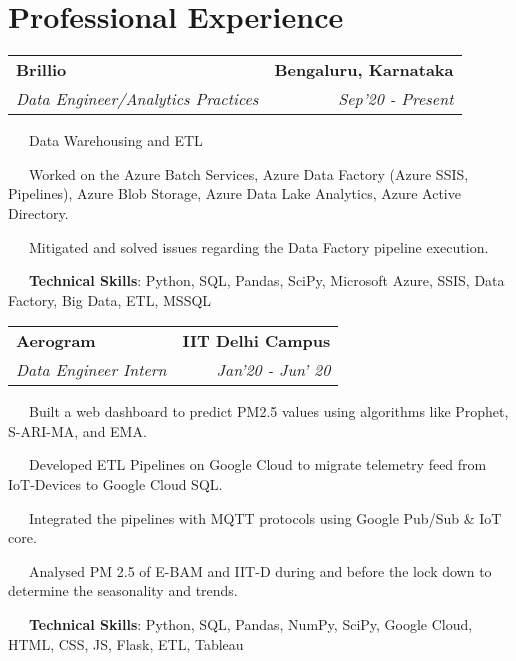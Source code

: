 \documentclass[a4paper,20pt]{article}
\makeatletter
\newcommand{\resumeSubheading}[4]{
  \vspace{-1pt}\item
    \begin{tabular*}{0.97\textwidth}{l@{\extracolsep{\fill}}r}
      \textbf{#1} & #2 \\
      \textit{#3} & \textit{#4} \\
    \end{tabular*}\vspace{-5pt}
}
\makeatother
\begin{document}
\section{Professional Experience}
  \resumeSubheading
      {\textbf{Brillio}}{\textbf{Bengaluru, Karnataka}}
      {Data Engineer/Analytics Practices}{Sep'20 - Present}
    \resumeSubHeadingEnd
     \begin{description}[font=$\bullet$]
        \item {~~~}{Data Warehousing and ETL}
        \vspace{-5pt}
        \item {~~~}{Worked on the Azure Batch Services, Azure Data Factory (Azure SSIS, Pipelines), Azure Blob Storage, Azure Data Lake Analytics, Azure Active Directory.}
        \vspace{-5pt}
        \item {~~~}{Mitigated and solved issues regarding the Data Factory pipeline execution.}
        \vspace{-5pt}
        \item {~~~}{\textbf{Technical Skills}: Python, SQL, Pandas, SciPy, Microsoft Azure, SSIS, Data Factory, Big Data, ETL, MSSQL}
    \end{description}
\vspace{-5pt}
  \resumeSubheading
      {\textbf{Aerogram }}{\textbf{IIT Delhi Campus}}
      {Data Engineer Intern}{Jan'20 - Jun' 20}
    \resumeSubHeadingEnd
     \begin{description}[font=$\bullet$]
        \item {~~~}{Built a web dashboard to predict PM2.5 values using algorithms like Prophet, S-ARI-MA, and EMA.}
        \vspace{-5pt}
        \item {~~~}{Developed ETL Pipelines on Google Cloud to migrate telemetry feed from IoT-Devices to Google Cloud SQL.}
        \vspace{-5pt}
        \item {~~~}{Integrated the pipelines with MQTT protocols using Google Pub/Sub \& IoT core.}
        \vspace{-5pt}
        \item {~~~}{Analysed PM 2.5 of E-BAM and IIT-D during and before the lock down to determine the seasonality and trends.}
        \vspace{-5pt}
        \item {~~~}{\textbf{Technical Skills}: Python, SQL, Pandas, NumPy, SciPy, Google Cloud, HTML, CSS, JS, Flask, ETL, Tableau}
        
    \end{description}
\end{document}
